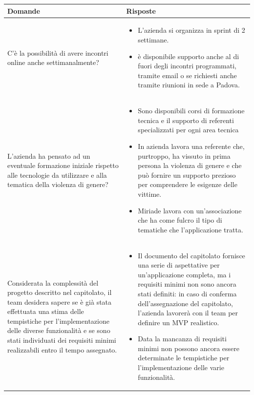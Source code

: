 \documentclass[a4paper,11pt]{article}
\begin{document}
{\footnotesize
\begin{tabularx}{\textwidth}{|>{\raggedright\arraybackslash}X|>{\raggedright\arraybackslash}X|}
\hline
\textbf{Domande} & \textbf{Risposte} \\
\hline
C'è la possibilità di avere incontri online anche settimanalmente?
&
\begin{itemize}
 \item L'azienda si organizza in sprint di 2 settimane.
 \item è disponibile supporto anche al di fuori degli incontri programmati, tramite email o se richiesti anche tramite riunioni in sede a Padova.
\end{itemize}
\\
\hline
L'azienda ha pensato ad un eventuale formazione iniziale rispetto alle tecnologie da utilizzare e alla tematica della violenza di genere?
&
\begin{itemize}
 \item Sono disponibili corsi di formazione tecnica e il supporto di referenti specializzati per ogni area tecnica
 \item In azienda lavora una referente che, purtroppo, ha vissuto in prima persona la violenza di genere e che può fornire un supporto prezioso per comprendere le esigenze delle vittime.
 \item Miriade lavora con un'associazione che ha come fulcro il tipo di tematiche che l'applicazione tratta. 
\end{itemize}\\
\hline
Considerata la complessità del progetto descritto nel capitolato, il team desidera sapere se è già stata effettuata una stima delle tempistiche per l'implementazione delle diverse funzionalità e se sono stati individuati dei requisiti minimi realizzabili entro il tempo assegnato.
&
\begin{itemize}
 \item Il documento del capitolato fornisce una serie di aspettative per un'applicazione completa, ma i requisiti minimi non sono ancora stati definiti: in caso di conferma dell'assegnazione del capitolato, l'azienda lavorerà con il team per definire un MVP realistico.
 \item Data la mancanza di requisiti minimi non possono ancora essere determinate le tempistiche per l'implementazione delle varie funzionalità.
\end{itemize}\\
\hline
\end{tabularx}
} 
\end{document}
